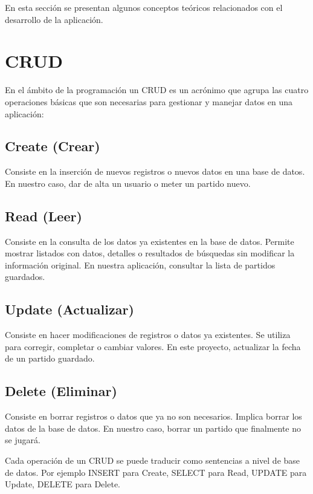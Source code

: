 
En esta sección se presentan algunos conceptos teóricos relacionados con el desarrollo de la aplicación.

\section{CRUD}
En el ámbito de la programación un CRUD es un acrónimo que agrupa las cuatro operaciones básicas que son necesarias para gestionar y manejar datos en una aplicación:


\subsection{Create (Crear)}
Consiste en la inserción de nuevos registros o nuevos datos en una base de datos. En nuestro caso, dar de alta un usuario o meter un partido nuevo.

\subsection{Read (Leer)}
Consiste en la consulta de los datos ya existentes en la base de datos. Permite mostrar listados con datos, detalles o resultados de búsquedas sin modificar la información original. En nuestra aplicación, consultar la lista de partidos guardados.

\subsection{Update (Actualizar)}
Consiste en hacer modificaciones de registros o datos ya existentes. Se utiliza para corregir, completar o cambiar valores. En este proyecto, actualizar la fecha de un partido guardado.

\subsection{Delete (Eliminar)}
Consiste en borrar registros o datos que ya no son necesarios. Implica borrar los datos de la base de datos. En nuestro caso, borrar un partido que finalmente no se jugará.


Cada operación de un CRUD se puede traducir como sentencias a nivel de base de datos.
Por ejemplo INSERT para Create, SELECT para Read, UPDATE para Update, DELETE para Delete.
 


